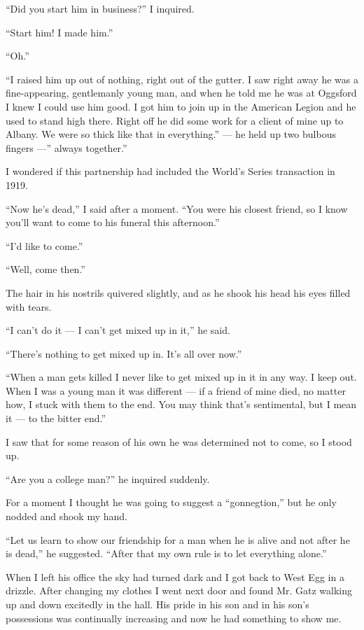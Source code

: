 \documentclass{znotebook}
\begin{document}
``Did you start him in business?'' I inquired.

``Start him! I made him.''

``Oh.''

``I raised him up out of nothing, right out of the gutter. I saw right away he was a fine-appearing, gentlemanly young man, and when he told me he was at Oggsford I knew I could use him good. I got him to join up in the American Legion and he used to stand high there. Right off he did some work for a client of mine up to Albany. We were so thick like that in everything.'' ---{} he held up two bulbous fingers ---'' always together.''

I wondered if this partnership had included the World's Series transaction in 1919.

``Now he's dead,'' I said after a moment. ``You were his closest friend, so I know you'll want to come to his funeral this afternoon.''

``I'd like to come.''

``Well, come then.''

The hair in his nostrils quivered slightly, and as he shook his head his eyes filled with tears.

``I can't do it ---{} I can't get mixed up in it,'' he said.

``There's nothing to get mixed up in. It's all over now.''

``When a man gets killed I never like to get mixed up in it in any way. I keep out. When I was a young man it was different ---{} if a friend of mine died, no matter how, I stuck with them to the end. You may think that's sentimental, but I mean it ---{} to the bitter end.''

I saw that for some reason of his own he was determined not to come, so I stood up.

``Are you a college man?'' he inquired suddenly.

For a moment I thought he was going to suggest a ``gonnegtion,'' but he only nodded and shook my hand.

``Let us learn to show our friendship for a man when he is alive and not after he is dead,'' he suggested. ``After that my own rule is to let everything alone.''

When I left his office the sky had turned dark and I got back to West Egg in a drizzle. After changing my clothes I went next door and found Mr. Gatz walking up and down excitedly in the hall. His pride in his son and in his son's possessions was continually increasing and now he had something to show me.
\end{document}
